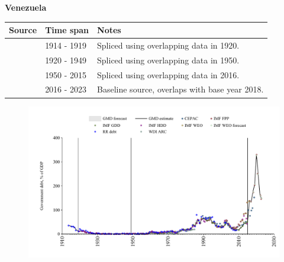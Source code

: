 \documentclass[12pt,a4paper,landscape]{article}
\begin{document}
\begin{adjustbox}{max totalsize={\paperwidth}{\paperheight},center}
\begin{minipage}[t][\textheight][t]{\textwidth}
\vspace*{0.5cm}
{}
\begin{center}
{\Large\bfseries Venezuela}
\end{center}
\vspace{0.5cm}
\begin{table}[H]
\centering
\small
\begin{tabular}{|l|l|l|}
\hline
\textbf{Source} & \textbf{Time span} & \textbf{Notes} \\
\hline
\rowcolor{white}\cite{RR_debt}& 1914 - 1919 &Spliced using overlapping data in 1920.\\
\rowcolor{lightgray}\cite{IMF_FPP}& 1920 - 1949 &Spliced using overlapping data in 1950.\\
\rowcolor{white}\cite{IMF_GDD}& 1950 - 2015 &Spliced using overlapping data in 2016.\\
\rowcolor{lightgray}\cite{IMF_FPP}& 2016 - 2023 &Baseline source, overlaps with base year 2018.\\
\hline
\end{tabular}
\end{table}
\begin{figure}[H]
\centering
\includegraphics[width=\textwidth,height=0.6\textheight,keepaspectratio]{graphs/VEN_govdebt_GDP.pdf}
\end{figure}
\end{minipage}
\end{adjustbox}
\end{document}
